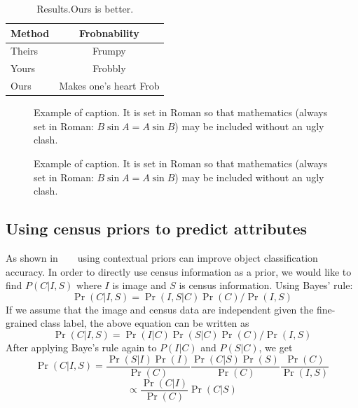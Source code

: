\documentclass[10pt,twocolumn,letterpaper]{article}
\begin{document}
\begin{table}
\begin{center}
\begin{tabular}{|l|c|}
\hline
Method & Frobnability \\
\hline\hline
Theirs & Frumpy \\
Yours & Frobbly \\
Ours & Makes one's heart Frob\\
\hline
\end{tabular}
\end{center}
\caption{Results.Ours is better.}
\label{table:car-att}
\end{table}

\begin{figure}[t]
\begin{center}
\fbox{\rule{0pt}{2in} \rule{0.9\linewidth}{0pt}}
\end{center}
   \caption{Example of caption.  It is set in Roman so that mathematics
   (always set in Roman: $B \sin A = A \sin B$) may be included without an
   ugly clash.}
\label{fig:fg-hierarchy}
\end{figure}

\begin{figure}[t]
\begin{center}
\fbox{\rule{0pt}{2in} \rule{0.9\linewidth}{0pt}}
\end{center}
   \caption{Example of caption.  It is set in Roman so that mathematics
   (always set in Roman: $B \sin A = A \sin B$) may be included without an
   ugly clash.}
\label{fig:fg-confusion}
\end{figure}

\subsection{Using census priors to predict attributes}
As shown in ~\cite{birdsnap} ~\cite{Other context stuff} using contextual priors can improve object classification accuracy. In order to directly use census information as a prior, we would like to find \(P(C|I,S)\) where \(I\) is image and \(S\) is census information. Using Bayes' rule: 
\begin{equation}
\Pr(C|I,S)=\Pr(I,S|C)\Pr(C)/\Pr(I,S)
\end{equation}
If we assume that the image and census data are independent given the fine-grained class label, the above equation can be written as 
\begin{equation}
\Pr(C|I,S)=\Pr(I|C)\Pr(S|C)\Pr(C)/\Pr(I,S)
\end{equation}
After applying Baye's rule again to \(P(I|C)\) and \(P(S|C)\), we get
\begin{equation}
\Pr(C|I,S)=\frac{\Pr(S|I)\Pr(I)}{\Pr(C)}\frac{\Pr(C|S)\Pr(S)}{\Pr(C)} \frac{\Pr(C)}{\Pr(I,S)}
\end{equation}
\begin{equation}
\propto \frac{\Pr(C|I)}{\Pr(C)}\Pr(C|S)
\label{eq:prior-eq}
\end{equation}
\end{document}
